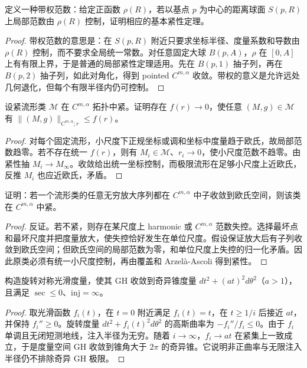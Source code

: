 \documentclass[11pt,a4paper,openany]{ctexbook}
\numberwithin{equation}{chapter}
\begin{document}
\begin{exercise}
定义一种带权范数：给定正函数 \(\rho(R)\)，若以基点 \(p\) 为中心的距离球面 \(S(p,R)\) 上局部范数由 \(\rho(R)\) 控制，证明相应的基本紧性定理。
\end{exercise}
\begin{proof}
带权范数的意思是：在 \(S(p,R)\) 附近只要求坐标半径、度量系数和导数由 \(\rho(R)\) 控制，而不要求全局统一常数。对任意固定大球 \(B(p,A)\)，\(\rho\) 在 \([0,A]\) 上有有限上界，于是普通的局部紧性定理适用。先在 \(B(p,1)\) 抽子列，再在 \(B(p,2)\) 抽子列，如此对角化，得到 pointed \(C^{m,\alpha}\) 收敛。带权的意义是允许远处几何退化，但每个有限半径内仍可控制。
\end{proof}

\begin{exercise}
设紧流形类 \(\mathcal M\) 在 \(C^{m,\alpha}\) 拓扑中紧。证明存在 \(f(r)\to0\)，使任意 \((M,g)\in\mathcal M\) 有 \(\|(M,g)\|_{C^{m,\alpha};r}\le f(r)\)。
\end{exercise}
\begin{proof}
对每个固定流形，小尺度下正规坐标或调和坐标中度量趋于欧氏，故局部范数趋零。若不存在统一 \(f(r)\)，则有 \(M_i\in\mathcal M\)、\(r_i\to0\)，使小尺度范数不趋零。由紧性抽 \(M_i\to M_\infty\)。收敛给出统一坐标控制，而极限流形在足够小尺度上近欧氏，反推 \(M_i\) 也应近欧氏，矛盾。
\end{proof}

\begin{exercise}
证明：若一个流形类的任意无穷放大序列都在 \(C^{m,\alpha}\) 中子收敛到欧氏空间，则该类在 \(C^{m,\alpha}\) 中紧。
\end{exercise}
\begin{proof}
反证。若不紧，则存在某尺度上 harmonic 或 \(C^{m,\alpha}\) 范数失控。选择最坏点和最坏尺度并把度量放大，使失控恰好发生在单位尺度。假设保证放大后有子列收敛到欧氏空间；但欧氏空间的局部范数为零，和单位尺度上失控的归一化矛盾。因此原类必须有统一小尺度控制，再由覆盖和 Arzelà-Ascoli 得到紧性。
\end{proof}

\begin{exercise}
构造旋转对称光滑度量，使其 GH 收敛到奇异锥度量 \(dt^2+(at)^2d\theta^2\)（\(a>1\)），且满足 \(\sec\le0\)、\(\mathrm{inj}=\infty\)。
\end{exercise}
\begin{proof}
取光滑函数 \(f_i(t)\)，在 \(t=0\) 附近满足 \(f_i(t)=t\)，在 \(t\ge 1/i\) 后接近 \(at\)，并保持 \(f_i''\ge0\)。旋转度量 \(dt^2+f_i(t)^2d\theta^2\) 的高斯曲率为 \(-f_i''/f_i\le0\)。由于 \(f_i\) 单调且无闭短测地线，注入半径为无穷。随着 \(i\to\infty\)，\(f_i\to at\) 在紧集上一致成立，于是度量空间 GH 收敛到锥角大于 \(2\pi\) 的奇异锥。它说明非正曲率与无限注入半径仍不排除奇异 GH 极限。
\end{proof}
\end{document}
